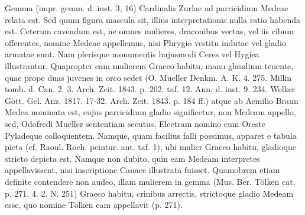 \documentclass[a4paper, 11pt, oneside, polutonikogreek, german]{article}
\begin{document}
Gemma (impr. gemm. d. inst. 3, 16) Cardinalis Zurlae ad parricidium Medeae relata est. Sed quum figura mascula sit, illius interpretationis nulla ratio habenda est. Ceterum cavendum est, ne omnes mulieres, draconibus vectas, vel iis cibum offerentes, nomine Medeae appellemus, nisi Phrygio vestitu indutae vel gladio armatae sunt. Nam plerisque monumentis hujusmodi Ceres vel Hygiea illustrantur. Quapropter eam mulierem Graeco habitu, manu glaudium tenente, quae prope duas juvenes in orco sedet (O. Mueller Denkm. A. K. 4. 275. Millin tomb. d. Can. 2. 3. Arch. Zeit. 1843. p. 202. taf. 12. Ann. d. inst. 9. 234. Welker Gött. Gel. Anz. 1817. 17-32. Arch. Zeit. 1843. p. 184 ff.) atque ab Aemilio Braun Medea nominata est, cujus parricidium gladio significetur, non Medeam appello, sed, Odofredi Mueller sententiam secutus, Electram nomino cum Oreste Pyladeque colloquentem. Namque, quam facilius falli possimus, apparet e tabula picta (cf. Raoul. Roch. peintur. ant. taf. 1), ubi mulier Graeco habitu, gladioque stricto depicta est. Namque non dubito, quin eam Medeam interpretes appellavissent, nisi inscriptione Canace illustrata fuisset. Quamobrem etiam definite contendere non audeo, illam mulierem in gemma (Mus. Ber. Tölken cat. p. 271. 4. 2. N. 251) Graeco habitu, crinibus arrectis, strictoque gladio Medeam esse, quo nomine Tölken eam appellavit (p. 271).
\end{document}
